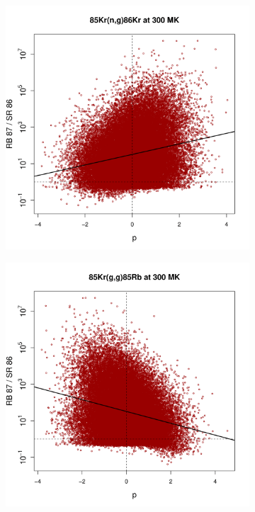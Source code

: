 \begin{figure}[!p]
\begin{subfigure}[b]{0.495\textwidth}
\end{subfigure}
\begin{subfigure}[b]{0.495\textwidth}   
\centering 
\includegraphics[width=\textwidth]{Chapter-3/figs/CorrRB87SR86_85Kr_n_g_86Kr_300MK.png}
\end{subfigure}
\hfill
\begin{subfigure}[b]{0.495\textwidth}   
\centering 
\includegraphics[width=\textwidth]{Chapter-3/figs/CorrRB87SR86_85Kr_g_g_85Rb_300MK.png}

\end{subfigure}
\end{figure}
